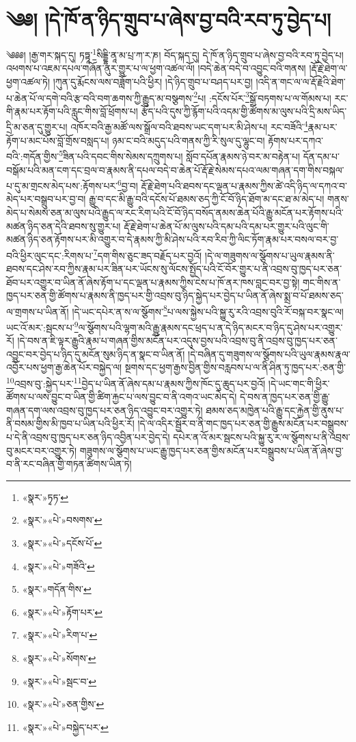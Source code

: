 \chapter{༄༅། །དེ་ཁོ་ན་ཉིད་གྲུབ་པ་ཞེས་བྱ་བའི་རབ་ཏུ་བྱེད་པ།}༄༅༅། །རྒྱ་གར་སྐད་དུ། ཏཏྟཱ་\footnote{«སྣར་»ཏྭཏ་}སིདྡྷི་ནཱ་མ་པྲ་ཀ་ར་ཎ། བོད་སྐད་དུ། དེ་ཁོ་ན་ཉིད་གྲུབ་པ་ཞེས་བྱ་བའི་རབ་ཏུ་བྱེད་པ། འཕགས་པ་འཇམ་དཔལ་གཞོན་ནུར་གྱུར་པ་ལ་ཕྱག་འཚལ་ལོ། །བདེ་ཆེན་བདེ་བ་འབྱུང་བའི་གནས། །རྡོ་རྗེ་ཐེག་ལ་ཕྱག་འཚལ་ཏེ། །ཀུན་དུ་རྨོངས་ལས་བཟློག་པའི་ཕྱིར། །དེ་ཉིད་གྲུབ་པ་བཤད་པར་བྱ། །འདི་ན་གང་ལ་ལ་རྡོ་རྗེའི་ཐེག་པ་ཆེན་པོ་ལ་དགེ་བའི་རྩ་བའི་བག་ཆགས་ཀྱི་རྒྱུད་མ་བསྩགས་\footnote{«སྣར་»«པེ་»བསགས་}པ། :དངོས་པོར་\footnote{«སྣར་»«པེ་»དངོས་པོ་}སྒྲོ་བཏགས་པ་ལ་གོམས་པ། རང་གི་རྣམ་པར་རྟོག་པའི་རླུང་གིས་བློ་ཕྲོགས་པ། རྩོད་པའི་དུས་ཀྱི་རྙོག་པའི་འདམ་གྱི་ཚོགས་མ་ལུས་པའི་དྲི་མས་ཡིད་དྲི་མ་ཅན་དུ་གྱུར་པ། འཁོར་བའི་རྒྱ་མཚོ་ལས་སྒྲོལ་བའི་ཐབས་ཡང་དག་པར་མི་ཤེས་པ། རང་བཟོའི་\footnote{«སྣར་»«པེ་»གཟོའི་}རྣམ་པར་རྟོག་པ་མང་པོས་བློ་གྲོས་བསླད་པ། ཉམ་ང་བའི་མདུད་པའི་གནས་ཀྱི་རི་སུལ་དུ་ལྷུང་བ། རྟོགས་པར་དཀའ་བའི་:གདོན་གྱིས་\footnote{«སྣར་»གདོན་གིས་}ཟིན་པའི་དབང་གིས་སེམས་དཀྲུགས་པ། སློབ་དཔོན་རྣམས་ཉེ་བར་མ་བརྟེན་པ། དོན་དམ་པ་བསྒོམ་པའི་མན་ངག་དང་བྲལ་བ་རྣམས་ནི་དཔལ་བདེ་བ་ཆེན་པོ་རྡོ་རྗེ་སེམས་དཔའ་ལམ་གཞན་དག་གིས་བསྐལ་པ་དུ་མ་གྲངས་མེད་པས་:རྟོགས་པར་\footnote{«སྣར་»«པེ་»རྟོག་པར་}བྱ་བ། རྡོ་རྗེ་ཐེག་པའི་ཐབས་དང་ལྡན་པ་རྣམས་ཀྱིས་ཚེ་འདི་ཉིད་ལ་དཀའ་བ་མེད་པར་བསྒྲུབ་པར་བྱ་བ། རྒྱུ་བ་དང་མི་རྒྱུ་བའི་དངོས་པོ་ཐམས་ཅད་ཀྱི་ངོ་བོ་ཉིད་ཐོག་མ་དང་ཐ་མ་མེད་པ། གནས་མེད་པ་སེམས་ཅན་མ་ལུས་པའི་རྒྱུད་ལ་རང་རིག་པའི་ངོ་བོ་ཉིད་བསོད་ནམས་ཆེན་པོའི་རྒྱུ་མངོན་པར་རྟོགས་པའི་མཚན་ཉིད་ཅན་དེའི་ཐབས་སུ་གྱུར་པ། རྡོ་རྗེ་ཐེག་པ་ཆེན་པོ་མ་ལུས་པའི་དམ་པའི་དམ་པར་གྱུར་པའི་ལུང་གི་མཚན་ཉིད་ཅན་རྟོགས་པར་མི་འགྱུར་བ་དེ་རྣམས་ཀྱི་མི་ཤེས་པའི་རབ་རིབ་ཀྱི་ལིང་ཏོག་རྣམ་པར་བསལ་བར་བྱ་བའི་ཕྱིར་ལུང་དང་:རིགས་པ་\footnote{«སྣར་»«པེ་»རིག་པ་}དག་གིས་ཅུང་ཟད་བརྗོད་པར་བྱའོ། །དེ་ལ་གཟུགས་ལ་སྩོགས་པ་ཡུལ་རྣམས་ནི་ཐབས་དང་ཤེས་རབ་ཀྱིས་རྣམ་པར་ཟིན་པར་ཡོངས་སུ་ལོངས་སྤྱོད་པའི་ངོ་བོར་གྱུར་པ་ནི་འབྲས་བུ་ཁྱད་པར་ཅན་ཐོབ་པར་འགྱུར་བ་ཡིན་ནོ་ཞེས་རྟོག་པ་དང་ལྡན་པ་རྣམས་ཀྱིས་ངེས་པ་ཁོ་ནར་ཁས་བླང་བར་བྱ་སྟེ། གང་གིས་ན་ཁྱད་པར་ཅན་གྱི་ཚོགས་པ་རྣམས་ནི་ཁྱད་པར་གྱི་འབྲས་བུ་ཉིད་སྐྱེད་པར་བྱེད་པ་ཡིན་ནོ་ཞེས་སྨྲ་བ་པོ་ཐམས་ཅད་ལ་གྲགས་པ་ཡིན་ནོ། །དེ་ཡང་དཔེར་ན་ས་ལ་སྩོགས་\footnote{«སྣར་»«པེ་»སོགས་}པ་ལས་སྐྱེས་པའི་སྐྱུ་རུ་རའི་འབྲས་བུའི་རོ་བསྐ་བར་སྣང་ལ། ཡང་འོ་མར་:སྦངས་པ་\footnote{«སྣར་»«པེ་»སྦང་བ་}ལ་སྩོགས་པའི་ལྷག་མའི་རྒྱུ་རྣམས་དང་ཕྲད་པ་ན་དེ་ཉིད་མངར་བ་ཉིད་དུ་ཤེས་པར་འགྱུར་རོ། །དེ་བས་ན་ཇི་ལྟར་རྒྱུའི་རྣམ་པ་གཞན་གྱིས་མངོན་པར་འདུས་བྱས་པའི་འབྲས་བུ་ནི་འབྲས་བུ་ཁྱད་པར་ཅན་འབྱུང་བར་བྱེད་པ་ཉིད་དུ་མངོན་སུམ་ཉིད་ན་སྣང་བ་ཡིན་ནོ། །དེ་བཞིན་དུ་གཟུགས་ལ་སྩོགས་པའི་ཡུལ་རྣམས་རྣལ་འབྱོར་པས་ཕྱག་རྒྱ་ཆེན་པོར་བསྐྱེད་ལ། སྔགས་དང་ཕྱག་རྒྱས་བྱིན་གྱིས་བརླབས་པ་ལ་ནི་ཤིན་ཏུ་ཁྱད་པར་:ཅན་གྱི་\footnote{«སྣར་»«པེ་»ཅན་གྱིས་}འབྲས་བུ་:སྐྱེད་པར་\footnote{«སྣར་»«པེ་»བསྐྱེད་པར་}བྱེད་པ་ཡིན་ནོ་ཞེས་དམ་པ་རྣམས་ཀྱིས་ཁོང་དུ་ཆུད་པར་བྱའོ། །དེ་ཡང་གང་གི་ཕྱིར་ཚོགས་པ་ལས་བྱུང་བ་ཡིན་གྱི་ཚིག་རྐྱང་པ་ལས་བྱུང་བ་ནི་འགའ་ཡང་མེད་དེ། དེ་བས་ན་ཁྱད་པར་ཅན་གྱི་རྒྱུ་གཞན་དག་ལས་འབྲས་བུ་ཁྱད་པར་ཅན་ཉིད་འབྱུང་བར་འགྱུར་ཏེ། ཐམས་ཅད་མཁྱེན་པའི་རྒྱུ་དང་རྐྱེན་གྱི་ནུས་པ་ནི་བསམ་གྱིས་མི་ཁྱབ་པ་ཡིན་པའི་ཕྱིར་རོ། །དེ་ལ་འདིར་སྦྱོར་བ་ནི་གང་ཁྱད་པར་ཅན་གྱི་རྒྱུས་མངོན་པར་བསྒྲུབས་པ་དེ་ནི་འབྲས་བུ་ཁྱད་པར་ཅན་ཉིད་འབྱིན་པར་བྱེད་དེ། དཔེར་ན་འོ་མར་སྦངས་པའི་སྐྱུ་རུ་ར་ལ་སྩོགས་པ་ནི་འབྲས་བུ་མངར་བར་འགྱུར་ཏེ། གཟུགས་ལ་སྩོགས་པ་ཡང་རྒྱུ་ཁྱད་པར་ཅན་གྱིས་མངོན་པར་བསྒྲུབས་པ་ཡིན་ནོ་ཞེས་བྱ་བ་ནི་རང་བཞིན་གྱི་གཏན་ཚིགས་ཡིན་ཏེ། 